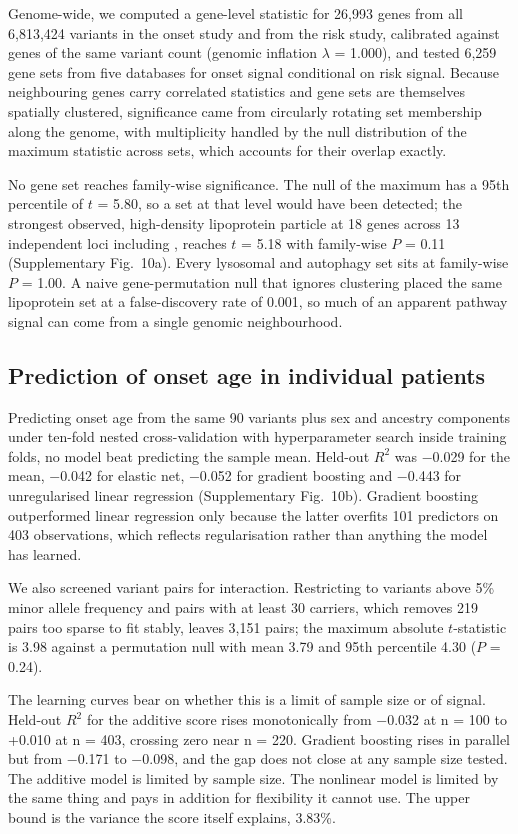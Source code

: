 \documentclass[10pt]{article}
\begin{document}
Genome-wide, we computed a gene-level statistic for 26,993 genes from all 6,813,424 variants in
the onset study and from the risk study, calibrated against genes of the same variant count
(genomic inflation $\lambda$ = 1.000), and tested 6,259 gene sets from five databases for onset
signal conditional on risk signal. Because neighbouring genes carry correlated statistics and gene
sets are themselves spatially clustered, significance came from circularly rotating set membership
along the genome, with multiplicity handled by the null distribution of the maximum statistic
across sets, which accounts for their overlap exactly.

No gene set reaches family-wise significance. The null of the maximum has a 95th percentile of
$t$ = 5.80, so a set at that level would have been detected; the strongest observed, high-density
lipoprotein particle at 18 genes across 13 independent loci including , reaches
$t$ = 5.18 with family-wise $P$ = 0.11 (Supplementary Fig.~10a). Every lysosomal and autophagy set
sits at family-wise $P$ = 1.00. A naive gene-permutation null that ignores clustering placed the
same lipoprotein set at a false-discovery rate of 0.001, so much of an apparent pathway signal can come from a single genomic neighbourhood.

\subsection*{Prediction of onset age in individual patients}

Predicting onset age from the same 90 variants plus sex and ancestry components under ten-fold
nested cross-validation with hyperparameter search inside training folds, no model beat predicting
the sample mean. Held-out $R^2$ was $-$0.029 for the mean, $-$0.042 for elastic net, $-$0.052 for
gradient boosting and $-$0.443 for unregularised linear regression (Supplementary Fig.~10b). Gradient boosting
outperformed linear regression only because the latter overfits 101 predictors on 403
observations, which reflects regularisation rather than anything the model has learned.

We also screened variant pairs for interaction. Restricting to variants above 5\% minor
allele frequency and pairs with at least 30 carriers, which removes 219 pairs too sparse to fit
stably, leaves 3,151 pairs; the maximum absolute $t$-statistic is 3.98 against a permutation null
with mean 3.79 and 95th percentile 4.30 ($P$ = 0.24).

The learning curves bear on whether this is a limit of sample size or of signal. Held-out $R^2$ for the additive score rises
monotonically from $-$0.032 at n = 100 to +0.010 at n = 403, crossing zero near n = 220. Gradient
boosting rises in parallel but from $-$0.171 to $-$0.098, and the gap does not close at any
sample size tested. The additive model is limited by sample size. The nonlinear model is limited by the same thing and pays in addition for flexibility it cannot use. The upper bound is the variance the score itself explains, 3.83\%.
\end{document}
